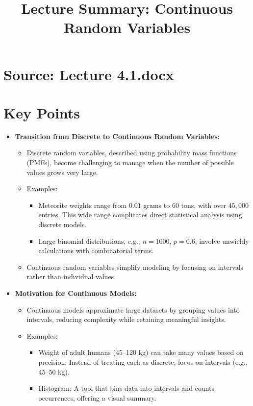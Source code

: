 \documentclass{article}
\title{Lecture Summary: Continuous Random Variables}
\author{}
\date{}
\begin{document}
\maketitle

\section*{Source: Lecture 4.1.docx}

\section*{Key Points}

\begin{itemize}
  \item \textbf{Transition from Discrete to Continuous Random Variables:}
    \begin{itemize}
      \item Discrete random variables, described using probability mass functions (PMFs), become challenging to manage when the number of possible values grows very large.
      \item Examples:
        \begin{itemize}
          \item Meteorite weights range from $0.01$ grams to $60$ tons, with over $45,000$ entries. This wide range complicates direct statistical analysis using discrete models.
          \item Large binomial distributions, e.g., $n = 1000$, $p = 0.6$, involve unwieldy calculations with combinatorial terms.
        \end{itemize}
      \item Continuous random variables simplify modeling by focusing on intervals rather than individual values.
    \end{itemize}

  \item \textbf{Motivation for Continuous Models:}
    \begin{itemize}
      \item Continuous models approximate large datasets by grouping values into intervals, reducing complexity while retaining meaningful insights.
      \item Examples:
        \begin{itemize}
          \item Weight of adult humans (45–120 kg) can take many values based on precision. Instead of treating each as discrete, focus on intervals (e.g., 45–50 kg).
          \item Histogram: A tool that bins data into intervals and counts occurrences, offering a visual summary.
        \end{itemize}
    \end{itemize}


\end{itemize}
\end{document}
